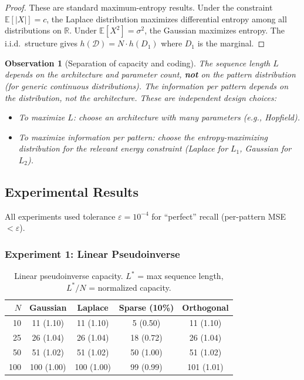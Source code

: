 \documentclass[11pt]{article}
\newtheorem{observation}[theorem]{Observation}
\theoremstyle{definition}
\theoremstyle{remark}
\begin{document}
\begin{proof}
These are standard maximum-entropy results. Under the constraint $\mathbb{E}[|X|] = c$, the Laplace distribution maximizes differential entropy among all distributions on $\mathbb{R}$. Under $\mathbb{E}[X^2] = \sigma^2$, the Gaussian maximizes entropy. The i.i.d.\ structure gives $h(\mathcal{D}) = N \cdot h(D_1)$ where $D_1$ is the marginal.
\end{proof}

\begin{observation}[Separation of capacity and coding]\label{obs:separation}
The sequence length $L$ depends on the architecture and parameter count, \textbf{not} on the pattern distribution (for generic continuous distributions). The information per pattern depends on the distribution, not the architecture. These are independent design choices:
\begin{itemize}
    \item To maximize $L$: choose an architecture with many parameters (e.g., Hopfield).
    \item To maximize information per pattern: choose the entropy-maximizing distribution for the relevant energy constraint (Laplace for $L_1$, Gaussian for $L_2$).
\end{itemize}
\end{observation}

\subsection{Experimental Results}

All experiments used tolerance $\varepsilon = 10^{-4}$ for ``perfect'' recall (per-pattern MSE $< \varepsilon$).

\subsubsection{Experiment 1: Linear Pseudoinverse}

\begin{table}[h]
\centering
\caption{Linear pseudoinverse capacity. $L^*$ = max sequence length, $L^*/N$ = normalized capacity.}
\begin{tabular}{r c c c c}
\toprule
$N$ & Gaussian & Laplace & Sparse (10\%) & Orthogonal \\
\midrule
10  & 11 (1.10) & 11 (1.10) & 5 (0.50) & 11 (1.10) \\
25  & 26 (1.04) & 26 (1.04) & 18 (0.72) & 26 (1.04) \\
50  & 51 (1.02) & 51 (1.02) & 50 (1.00) & 51 (1.02) \\
100 & 100 (1.00) & 100 (1.00) & 99 (0.99) & 101 (1.01) \\
\bottomrule
\end{tabular}
\label{tab:linear}
\end{table}
\end{document}
